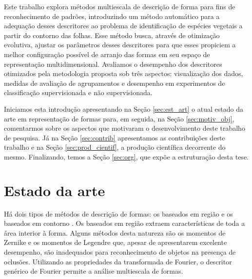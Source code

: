 Este trabalho explora métodos multiescala de descrição de forma para fins de reconhecimento de padrões, introduzindo um método automático para a adequação desses descritores ao problema de identificação de espécies vegetais a partir do contorno das folhas. Esse método busca, através de otimização evolutiva,   ajustar os parâmetros desses descritores para que esses propiciem a melhor configuração possível de arranjo das formas em seu espaço de representação multidimensional. Avaliamos o desempenho dos descritores otimizados pela metodologia proposta sob três aspectos: visualização dos dados, medidas de avaliação de agrupamentos e desempenho em experimentos de classificação supervisionada e não supervisionada.   



Iniciamos esta introdução apresentando na Seção \ref{sec:est_art} o atual estado da arte em representação de formas para, em seguida, na Seção \ref{sec:motiv_obj}, comentarmos sobre os aspectos que motivaram o desenvolvimento deste trabalho de pesquisa. Já na Seção \ref{sec:contrib} apresentamos as contribuições deste trabalho e na Seção \ref{sec:prod_cientif}, a produção científica decorrente do mesmo. Finalizando, temos a Seção \ref{sec:org}, que expõe a estruturação desta tese.

\section {Estado da arte \label{sec:est_art}}

Há dois tipos de métodos de descrição de formas: os baseados em região e os baseados em contorno \cite{Zhang:2004}. Os baseados em região extraem características de toda a área interior à forma. Alguns métodos desta natureza são os momentos de Zernike \cite{Kim:2000} e os momentos de Legendre \cite{Yang:2006} que, apesar de apresentarem excelente desempenho, são inadequados para reconhecimento de objetos na presença de oclusões. Utilizando as propriedades da transformada de Fourier, o descritor genérico de Fourier \cite{Zhang:2002} permite a análise multiescala de formas.

